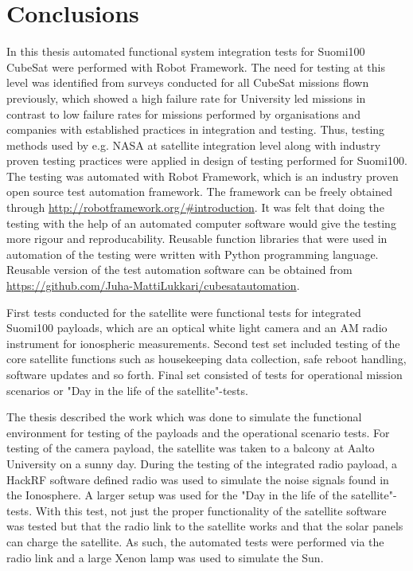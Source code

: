 \documentclass[english,12pt,a4paper,pdftex,elec,utf8]{aaltothesis}
\begin{document}


\clearpage

\section{Conclusions} 
In this thesis automated functional system integration tests for Suomi100 CubeSat were performed with Robot Framework. The need for testing at this level was identified from surveys conducted for all CubeSat missions flown previously, which showed a high failure rate for University led missions in contrast to low failure rates for missions performed by organisations and companies with established practices in integration and testing. Thus, testing methods used by e.g. NASA at satellite integration level along with industry proven testing practices were applied in design of testing performed for Suomi100. The testing was automated with Robot Framework, which is an industry proven open source test automation framework. The framework can be freely obtained through \url{http://robotframework.org/#introduction}. It was felt that doing the testing with the help of an automated computer software would give the testing more rigour and reproducability. Reusable function libraries that were used in automation of the testing were written with Python programming language. Reusable version of the test automation software can be obtained from \url{https://github.com/Juha-MattiLukkari/cubesatautomation}.\par
First tests conducted for the satellite were functional tests for integrated Suomi100 payloads, which are an optical white light camera and an AM radio instrument for ionospheric measurements. Second test set included testing of the core satellite functions  such as housekeeping data collection, safe reboot handling, software updates and so forth. Final set consisted of tests for operational mission scenarios or "Day in the life of the satellite"-tests.\par 
The thesis described the work which was done to simulate the functional environment for testing of the payloads and the operational scenario tests. For testing of the camera payload, the satellite was taken to a balcony at Aalto University on a sunny day. During the testing of the integrated radio payload,  a HackRF software defined radio was used to simulate the noise signals found in the Ionosphere. A larger setup was used for the "Day in the life of the satellite"-tests. With this test, not just the proper functionality of the satellite software was tested but that the radio link to the satellite works and that the solar panels can charge the satellite. As such, the automated tests were performed via the radio link and a large Xenon lamp was used to simulate the Sun.\par 
\end{document}

